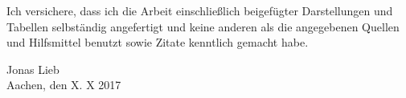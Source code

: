 
Ich versichere, dass ich die Arbeit einschließlich beigefügter Darstellungen und Tabellen selbständig angefertigt und keine anderen als die angegebenen Quellen und Hilfsmittel benutzt sowie Zitate kenntlich gemacht habe. 

\vspace{3cm}

Jonas Lieb \\
Aachen, den X. X 2017